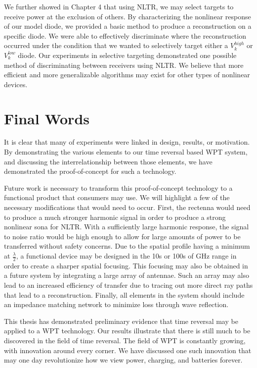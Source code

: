 We further showed in Chapter 4 that using NLTR, we may select targets to receive power at the exclusion of others. By characterizing the nonlinear response of our model diode, we provided a basic method to produce a reconstruction on a specific diode. We were able to effectively discriminate where the reconstruction occurred under the condition that we wanted to selectively target either a $V_{k}^{high}$ or $V_{k}^{low}$ diode. Our experiments in selective targeting demonstrated one possible method of discriminating between receivers using NLTR. We believe that more efficient and more generalizable algorithms may exist for other types of nonlinear devices. 

\section{Final Words}

It is clear that many of experiments were linked in design, results, or motivation. By demonstrating the various elements to our time reversal based WPT system, and discussing the interrelationship between those elements, we have demonstrated the proof-of-concept for such a technology. 

Future work is necessary to transform this proof-of-concept technology to a functional product that consumers may use. We will highlight a few of the necessary modifications that would need to occur. First, the rectenna would need to produce a much stronger harmonic signal in order to produce a strong nonlinear sona for NLTR. With a sufficiently large harmonic response, the signal to noise ratio would be high enough to allow for large amounts of power to be transferred without safety concerns. Due to the spatial profile having a minimum at $\frac{\lambda}{2}$, a functional device may be designed in the 10s or 100s of GHz range in order to create a sharper spatial focusing. This focusing may also be obtained in a future system by integrating a large array of antennae. Such an array may also lead to an increased efficiency of transfer due to tracing out more direct ray paths that lead to a reconstruction.  Finally, all elements in the system should include an impedance matching network to minimize loss through wave reflection. 

This thesis has demonstrated preliminary evidence that time reversal may be applied to a WPT technology. Our results illustrate that there is still much to be discovered in the field of time reversal. The field of WPT is constantly growing, with innovation around every corner. We have discussed one such innovation that may one day revolutionize how we view power, charging, and batteries forever.
